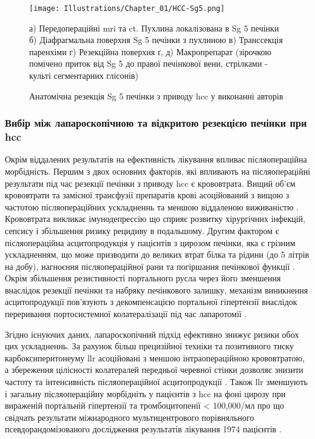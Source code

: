 \begin{refsection}
\begin{figure}[h]
\caption{Анатомічна резекція Sg 5 печінки з приводу \acrshort{hcc} у виконанні авторів}

\texttt{[image: Illustrations/Chapter\_01/HCC-Sg5.png]}
\label{fig:HCC-Sg5}

\medskip
\small
а) Передопераційні \acrshort{mri} та \acrshort{ct}. Пухлина локалізована в Sg 5 печінки б) Діафрагмальна поверхня Sg 5 печінки з пухлиною  в) Транссекція паренхіми г) Резекційна поверхня ґ, д) Макропрепарат (зірочкою помічено приток від Sg 5 до правої печінкової вени, стрілками - культі сегментарних глісонів)

\end{figure}



\subsubsection{Вибір між лапароскопічною та відкритою резекцією печінки при \acrshort{hcc}} 
Окрім віддалених результатів на ефективність лікування впливає післяопераційна морбідність. Першим з двох основних факторів, які впливають на післяопераційні результати під час резекції печінки з приводу \acrshort{hcc} є крововтрата. Вищий об'єм крововтрати та замісної трансфузії препаратів крові асоційований з вищою з частотою післяопераційних ускладненнь та меншою віддаленою виживаністю \cite{DeBoer2007, Romano2012}. Крововтрата викликає імунодепрессію що сприяє розвитку хірургічних інфекцій, сепсису і збільшення ризику рецидиву в подальшому. Другим фактором є післяопераційна асцитопродукція у пацієнтів з цирозом печінки, яка є грізним ускладненням, що може призводити до великих втрат білка та рідини (до 5 літрів на добу), нагноєння післяопераційної рани та погіршання печінкової функції \cite{Ishii2014}. Окрім збільшення резистивності портального русла через його зменшення внаслідок резекції печінки та набряку печінкового залишку, механізм виникнення асцитопродукції пов'язують з декомпенсацією портальної гіпертензії внаслідок переривання портосистемної колатералізації під час лапаротомії \cite{Kanazawa2013}. 

Згідно існуючих даних, лапароскопічний підхід ефективно знижує ризики обох цих ускладненнь. За рахунок більш прецизійної техніки та позитивного тиску карбоксиперитонеуму \acrshort{llr} асоційовані з меншою інтраопераційною крововтратою, а збереження цілісності колатералей передньої черевної стінки дозволяє знизити частоту та інтенсивність післяопераційної асцитопродукції \cite{Truant2011}. Також \acrshort{llr} зменшують і загальну післяопераційну морбідніть у пацієнтів з \acrshort{hcc} на фоні цирозу при вираженій портальній гіпертензії та тромбоцитопенії < 100,000/мл про що свідчать результати міжнародного мультицентрового порівняльного псевдорандомізованого дослідження результатів лікування 1974 пацієнтів \cite{Ruzzenente2020}.


\end{refsection}
